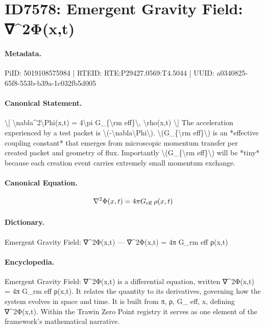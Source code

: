 \section*{ID7578: Emergent Gravity Field: ∇\textasciicircum{}2Φ(x,t)}
\paragraph{Metadata.}
PiID: 5019108575984 | RTEID: RTE:P29427.0569:T4.5044 | UUID: a0340825-65f8-553b-b39a-1c032fb5d005

\paragraph{Canonical Statement.}
\textbackslash{}[ \textbackslash{}nabla\textasciicircum{}2\textbackslash{}Phi(x,t) = 4\textbackslash{}pi G\_\{\textbackslash{}rm eff\}\textbackslash{}, \textbackslash{}rho(x,t) \textbackslash{}] The acceleration experienced by a test packet is \textbackslash{}(-\textbackslash{}nabla\textbackslash{}Phi\textbackslash{}). \textbackslash{}(G\_\{\textbackslash{}rm eff\}\textbackslash{}) is an *effective coupling constant* that emerges from microscopic momentum transfer per created packet and geometry of flux. Importantly \textbackslash{}(G\_\{\textbackslash{}rm eff\}\textbackslash{}) will be *tiny* because each creation event carries extremely small momentum exchange.

\paragraph{Canonical Equation.}
\[
\nabla^2\Phi(x,t) = 4\pi G_{\rm eff}\, \rho(x,t)
\]

\paragraph{Dictionary.}
Emergent Gravity Field: ∇\textasciicircum{}2Φ(x,t) — ∇\textasciicircum{}2Φ(x,t) = 4π G\_rm eff ρ(x,t)

\paragraph{Encyclopedia.}
Emergent Gravity Field: ∇\textasciicircum{}2Φ(x,t) is a differential equation, written ∇\textasciicircum{}2Φ(x,t) = 4π G\_rm eff ρ(x,t). It relates the quantity to its derivatives, governing how the system evolves in space and time. It is built from π, ρ, G\_ eff, x, defining ∇\textasciicircum{}2Φ(x,t). Within the Trawin Zero Point registry it serves as one element of the framework's mathematical narrative.
